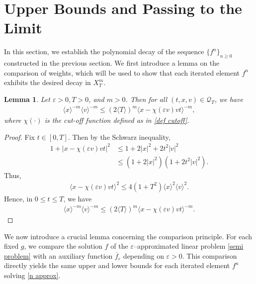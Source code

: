 \documentclass[reqno,11pt,final]{amsart}
\theoremstyle{plain}
\newtheorem{lemma}[theorem]{Lemma}
\numberwithin{equation}{section}
\numberwithin{theorem}{section}
\begin{document}
\section{Upper Bounds and Passing to the Limit}
\label{boundedness}In this section, we establish the polynomial decay of the sequence $\{f^{n}\}_{n\ge 0}$ constructed in the previous section.  
We first introduce a lemma on the comparison of weights, which will be used to show that each iterated element $f^{n}$ exhibits the desired decay in $X_T^m$.



\begin{lemma}\label{embed}Let $\varepsilon>0, T>0$, and $m>0$. Then for all $(t,x,v)\in\mathcal{Q}_T$, we have
\begin{align*}
 \langle x\rangle^{-m} \langle v\rangle^{-m}\le (2\langle T\rangle)^m \langle x-\chi(\varepsilon v)vt\rangle^{-m},
\end{align*}where $\chi(\cdot)$ is the cut-off function defined as in \eqref{def cutoff}.
\end{lemma}

\begin{proof}
Fix $t\in[0,T]$. Then by the Schwarz inequality,
\begin{align*}
    1+|x-\chi(\varepsilon v)vt|^2 &\le 1+2|x|^2 + 2t^2|v|^2\\
    &\le (1+2|x|^2)(1+2t^2|v|^2).
\end{align*}Thus,
\begin{align*}
    \langle x-\chi(\varepsilon v)vt\rangle^2 \le 4(1+T^2) \langle x\rangle^2\langle v\rangle^2.
\end{align*}Hence, in $0\le t\le T$, we have
\begin{align*}
    \langle x\rangle^{-m}\langle v\rangle^{-m} \le (2\langle T\rangle)^{m}\langle x-\chi(\varepsilon v)vt\rangle^{-m}.
\end{align*}
\end{proof}


We now introduce a crucial lemma concerning the comparison principle.  
For each fixed $g$, we compare the solution $f$ of the $\varepsilon$–approximated linear problem \eqref{semi problem} with an auxiliary function $\overline{f}_{\varepsilon}$ depending on $\varepsilon>0$.  
This comparison directly yields the same upper and lower bounds for each iterated element $f^{n}$ solving \eqref{n approx}.
\end{document}
